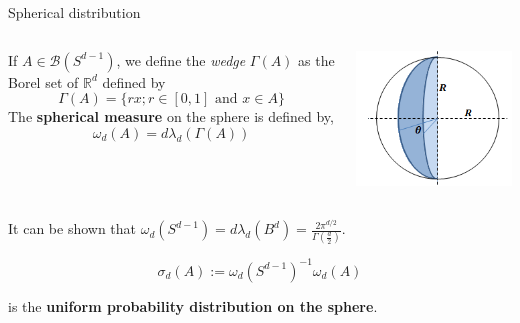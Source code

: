 \documentclass[handout]{beamer} %
\begin{document}
  \begin{frame}{Spherical distribution}

    \begin{columns}
      \begin{column}{0.75\textwidth}

        \begin{definition}
          If $A \in \mathcal{B}\left(S^{d-1}\right)$, we define the \emph{wedge}
          $\Gamma(A)$ as the Borel set
          of $\mathbb{R}^{d}$ defined by
          $$
          \Gamma(A)=\{r x ; r \in[0,1] \text { and } x \in A\}
          $$
          The \textbf{spherical measure} on the sphere is defined by,
          $$
          \omega_{d}(A)=d \lambda_{d}(\Gamma(A))
          $$
        \end{definition}
      \end{column}
      \pause
      \begin{column}{0.25\textwidth}  %
        \begin{center}
          \includegraphics[width=1\textwidth]{wedge.png}
        \end{center}
      \end{column}
    \end{columns}

    \pause

    It can be shown that $\omega_d(S^{d-1}) = d\lambda_d(B^d)  = \frac{2 \pi^{d /
        2}}{\Gamma\left(\frac{d}{2}\right)} $.

    \begin{equation*}
      \sigma_{d}(A):= \omega_d(S^{d-1})^{-1} \omega_d(A)
    \end{equation*}

    is the \textbf{uniform probability distribution on the sphere}.

  \end{frame}
\end{document}
